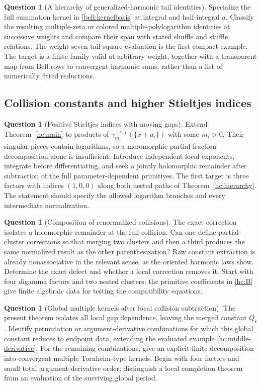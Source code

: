 \documentclass[11pt,a4paper]{article}
\numberwithin{equation}{section}
\theoremstyle{definition}
\newtheorem{question}[theorem]{Question}
\theoremstyle{remark}
\begin{document}
\begin{question}[A hierarchy of generalized-harmonic tail identities]
Specialize the full summation kernel in
\eqref{bell:kernelbasis} at integral and half-integral $a$.
Classify the resulting multiple-zeta or colored multiple-polylogarithm
identities at successive weights and compare their span with stated
shuffle and stuffle relations. The weight-seven tail-square
evaluation is the first compact example. The target is a finite
family valid at arbitrary weight, together with a transparent map
from Bell rows to convergent harmonic sums, rather than a list of
numerically fitted reductions.
\end{question}

\subsection{Collision constants and higher Stieltjes indices}

\begin{question}[Positive Stieltjes indices with moving gaps]
Extend Theorem~\ref{hc:main} to products of
$\gamma_{m_i}^{(r_i)}(\{x+a_i\})$ with some $m_i>0$.
Their singular pieces contain logarithms, so a meromorphic
partial-fraction decomposition alone is insufficient. Introduce
independent local exponents, integrate before differentiating, and
seek a jointly holomorphic remainder after subtraction of the full
parameter-dependent primitives. The first target is three factors
with indices $(1,0,0)$ along both nested paths of
Theorem~\ref{hc:hierarchy}. The statement should specify the
allowed logarithm branches and every intermediate normalization.
\end{question}

\begin{question}[Composition of renormalized collisions]
The exact correction isolates a holomorphic remainder at the full
collision. Can one define partial-cluster corrections so that merging
two clusters and then a third produces the same normalized result as
the other parenthesization? Raw constant extraction is already
nonassociative in the relevant sense, as the oriented harmonic laws
show. Determine the exact defect and whether a local correction
removes it. Start with four digamma factors and two nested clusters;
the primitive coefficients in \eqref{hc:B} give finite algebraic
data for testing the compatibility equations.
\end{question}

\begin{question}[Global multiple kernels after local collision subtraction]
The present theorem isolates all local gap dependence, leaving the
merged constant $Q_{\boldsymbol r}$. Identify permutation or
argument-derivative combinations for which this global constant
reduces to endpoint data, extending the evaluated example
\eqref{hc:middle-derivative}. For the remaining combinations,
give an explicit finite decomposition into convergent multiple
Tornheim-type kernels. Begin with four factors and small total
argument-derivative order; distinguish a local completion theorem
from an evaluation of the surviving global period.
\end{question}
\end{document}
